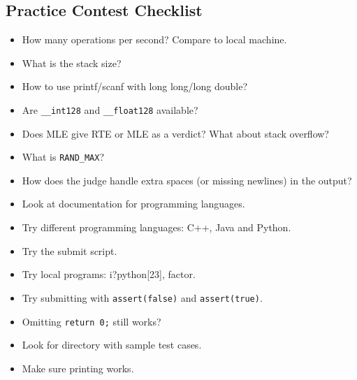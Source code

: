 \documentclass[8pt,a4paper,landscape,oneside]{amsart}
\newenvironment{myitemize}
{\begin{itemize}[leftmargin=.3cm]
	\setlength{\itemsep}{0pt}
	\setlength{\parskip}{0pt}
	\setlength{\parsep}{0pt}     }
{ \end{itemize}                  }
\begin{document}
\begin{multicols*}{3}
\vspace{3em}
\section*{Practice Contest Checklist}
\begin{myitemize}
	\item How many operations per second? Compare to local machine.
	\item What is the stack size?
	\item How to use printf/scanf with long long/long double?
	\item Are \texttt{\_{}\_{}int128} and \texttt{\_{}\_{}float128} available?
	\item Does MLE give RTE or MLE as a verdict? What about stack overflow?
	\item What is \texttt{RAND\_{}MAX}?
	\item How does the judge handle extra spaces (or missing newlines) in the output?
	\item Look at documentation for programming languages.
	\item Try different programming languages: C++, Java and Python.
	\item Try the submit script.
	\item Try local programs: i?python[23], factor.
	\item Try submitting with \texttt{assert(false)} and \texttt{assert(true)}.
	\item Omitting \texttt{return 0;} still works?
	\item Look for directory with sample test cases.
	\item Make sure printing works.
\end{myitemize}

\label{LastPage}
\end{multicols*}
\end{document}
